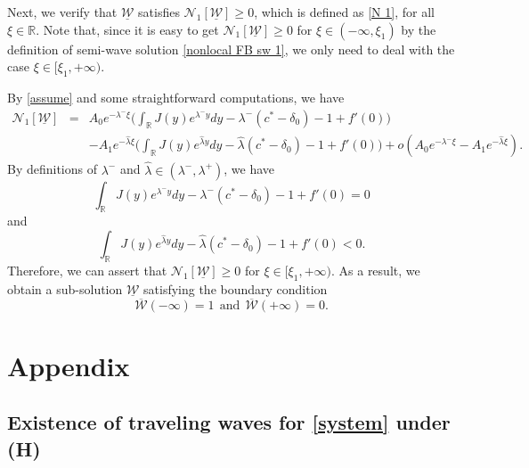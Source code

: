 \documentclass[11pt,a4paper]{article}
\numberwithin{equation}{section}
\numberwithin{figure}{section}
\newcommand\beaa{\begin{eqnarray*}}
\newcommand\eeaa{\end{eqnarray*}}
\begin{document}
Next, we verify that $\underline{\mathcal W}$ satisfies $\mathcal N_1[\underline{\mathcal W}]\ge 0$, which is defined as \eqref{N 1}, for all $\xi\in\mathbb{R}$. Note that, since it is easy to get  $\mathcal N_1[\underline{\mathcal W}]\ge 0$ for $\xi\in(-\infty,\xi_1)$ by the definition of semi-wave solution \eqref{nonlocal FB sw 1}, we only need to deal with the case $\xi\in[\xi_1,+\infty)$.

By \eqref{assume} and some straightforward computations, we have
\beaa
\mathcal N_1[\underline{\mathcal W}]&=&A_0e^{-\lambda^-\xi}\Big(\int_{\mathbb{R}}J(y)e^{\lambda^-y}dy-\lambda^-(c^*-\delta_0)-1+f'(0)\Big)\\
&&-A_1e^{-\hat\lambda\xi}\Big(\int_{\mathbb{R}}J(y)e^{\hat\lambda y}dy-\hat\lambda(c^*-\delta_0)-1+f'(0)\Big)+o(A_0e^{-\lambda^-\xi}-A_1e^{-\hat\lambda\xi}).
\eeaa
By definitions of $\lambda^-$ and $\hat\lambda\in(\lambda^-,\lambda^+)$, we have
$$\int_{\mathbb{R}}J(y)e^{\lambda^-y}dy-\lambda^-(c^*-\delta_0)-1+f'(0)=0$$
and 
$$\int_{\mathbb{R}}J(y)e^{\hat\lambda y}dy-\hat\lambda(c^*-\delta_0)-1+f'(0)<0.$$
Therefore, we can assert that $\mathcal N_1[\underline{\mathcal W}]\ge 0$ for $\xi\in[\xi_1,+\infty)$. As a result, we obtain a sub-solution $\underline{\mathcal W}$  satisfying the boundary condition
$$\overline{\mathcal{W}}(-\infty)=1\ \ \text{and}\ \ \overline{\mathcal{W}}(+\infty)=0.$$





\appendix
\section{Appendix}

\subsection{Existence of traveling waves for \eqref{system} under {\bf(H)}}
\end{document}
